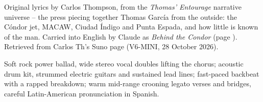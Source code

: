 
\label{sec:detras-del-condor}
\begin{notes}
Original lyrics by Carlos Thompson, from the \emph{Thomas' Entourage} narrative universe -- the press piecing together Thomas García from the outside: the Cóndor jet, MACAW, Ciudad Índigo and Punta Espada, and how little is known of the man. Carried into English by Claude as \emph{Behind the Condor} (page \pageref{sec:behind-the-condor}). Retrieved from Carlos Th's Suno page (V6-MINI, 28 October 2026).
\end{notes}
\begin{style}
Soft rock power ballad, wide stereo vocal doubles lifting the chorus; acoustic drum kit, strummed electric guitars and sustained lead lines; fast-paced backbeat with a rapped breakdown; warm mid-range crooning legato verses and bridges, careful Latin-American pronunciation in Spanish.
\end{style}
